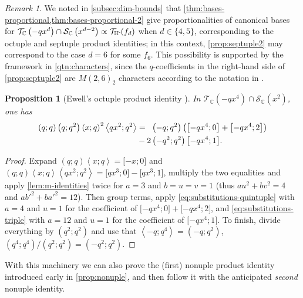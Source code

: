 \documentclass[reqno,11pt]{amsart}
\newtheorem{proposition}[theorem]{Proposition}
\theoremstyle{definition}
\theoremstyle{remark}
\newtheorem*{remark}{Remark}
\numberwithin{equation}{section}
\newcommand{\C}{\mathbb{C}}
\newcommand{\Hminus}{{\mathbb{H}^{\textnormal{-}\hspace{-0.03cm}}}}
\newcommand{\mT}{\mathcal{T}}
\newcommand{\mS}{\mathcal{S}}
\newcommand{\la}{\left\langle}
\newcommand{\ra}{\right\rangle}
\newcommand{\vect}[2]{\big[{#1};{#2}\big]}
\begin{document}
\begin{remark}
We noted in \cref{subsec:dim-bounds} that \cref{thm:bases-proportional,thm:bases-proportional-2} give proportionalities of canonical bases for $\mT_\C\left(-qx^d\right) \cap \mS_\C\left(x^{d-2}\right) \propto \mT_\Hminus(f_d)$ when $d \in \{4, 5\}$, corresponding to the octuple and septuple product identities; in this context, \cref{prop:septuple2} may correspond to the case $d = 6$ for some $f_6$. This possibility is supported by the framework in \cref{qtn:characters}, since the $q$-coefficients in the right-hand side of \cref{prop:septuple2} are $M(2, 6)_2$ characters according to the notation in \cite[(5.2)]{andrews1999a2}.
\end{remark}
\begin{proposition}[Ewell's octuple product identity \cite{ewell1982octuple}] \label{prop:octuple}
In $\mT_\C\left(-qx^4\right) \cap \mS_\C\left(x^2\right)$, one has
\begin{equation}\label{eq:octuple}
\begin{aligned}
    (q; q)\left(q; q^2\right) \la x; q \ra^2 \la qx^2; q^2 \ra &= 
    \hspace{0.19cm} \left(-q; q^2\right)\left(\vect{-qx^4}{0} + \vect{-qx^4}{2}\right) \\
    &- 2\left(-q^2; q^2\right) \vect{-qx^4}{1}.
\end{aligned}
\end{equation}
\end{proposition}
\begin{proof}
Expand $(q; q)\la x; q\ra = \vect{-x}{0}$ and $(q; q)\la x; q\ra \la qx^2; q^2\ra = \vect{qx^3}{0} - \vect{qx^3}{1}$, multiply the two equalities and apply \cref{lem:m-identities} twice for $a = 3$ and $b = u = v = 1$ (thus $au^2 + bv^2 = 4$ and $ab'^2 + ba'^2 = 12$). Then group terms, apply \cref{eq:substitutions-quintuple} with $a = 4$ and $u = 1$ for the coefficient of $\vect{-qx^4}{0} + \vect{-qx^4}{2}$, and \cref{eq:substitutions-triple} with $a = 12$ and $u = 1$ for the coefficient of $\vect{-qx^4}{1}$. To finish, divide everything by $\left(q^2; q^2\right)$ and use that $\la -q; q^4 \ra = \left(-q; q^2\right)$, $\left(q^4; q^4\right)/\left(q^2; q^2\right) = \left(-q^2; q^2\right)$.
\end{proof}
With this machinery we can also prove the (first) nonuple product identity introduced early in \cref{prop:nonuple}, and then follow it with the anticipated \emph{second} nonuple identity.
\end{document}
